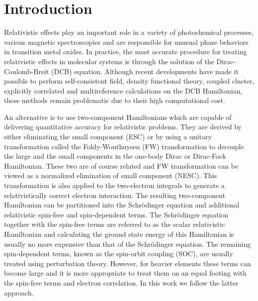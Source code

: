 \documentclass[10pt,aps,prb,twocolumn,amsmath,amssymb,superscriptaddress]{revtex4-1}
\begin{document}
\section{Introduction}
Relativistic effects play an important role in a variety of photochemical processes, various magnetic spectroscopies and are responsible for unusual phase behaviors in transition metal oxides. In practice, the most accurate procedure for treating relativistic effects in molecular systems is through the solution of the Dirac-Coulomb-Breit (DCB) equation\cite{Bar-Chapter,Liu2010,Fleig2012,Saue2011,Kut-CP-2012,Pyy-ARPC-2012,Pyy-CR-2012}. Although recent developments have made it possible to perform self-consistent field\cite{Pernpointner2000,Yanai2001,Thyssen2008,Kelley2013}, density functional theory\cite{Yanai2001a,Saue2002,Belpassi2011,Mizukami2011}, coupled cluster\cite{Nataraj2010,Sorensen2011}, explicitly correlated\cite{Bylicki2008,Li2011,Ten-no2012} and multireference\cite{Almoukhalalati2016,Bates2015,Fleig2003,Fleig2006,Knecht2010,Shiozaki2015} calculations on the DCB Hamiltonian, these methods remain problematic due to their high computational cost.

An alternative is to use two-component Hamiltonians which are capable of delivering quantitative accuracy for relativistic problems. They are derived by either eliminating the small component (ESC) or by using a unitary transformation called the Foldy-Wouthuysen (FW) transformation\cite{FolWou-PR-1950} to decouple the large and the small components in the one-body Dirac or Dirac-Fock Hamiltonian. These two are of course related and FW transformation can be viewed as a normalized elimination of small component (NESC). This transformation is also applied to the two-electron integrals to generate a relativistically correct electron interaction. The resulting two-component Hamiltonian can be partitioned into the Schr\"{o}dinger equation and additional relativistic spin-free and spin-dependent terms. The Schr\"{o}dinger equation together with the spin-free terms are referred to as the scalar relativistic Hamiltonian and calculating the ground state energy of this Hamiltonian is usually no more expensive than that of
the Schr\"{o}dinger equation. The remaining spin-dependent terms, known as the spin-orbit coupling (SOC), are usually treated using perturbation theory. However, for heavier elements these terms can become large and it is more appropriate to treat them on an equal footing with the spin-free terms and electron correlation. In this work we follow the latter approach.
\end{document}
